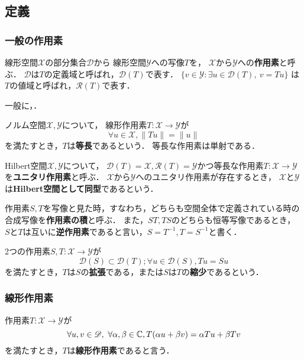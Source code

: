 \documentclass[a4j]{jarticle}
\newcommand{\dom}{\mathscr{D}}
\newcommand{\range}{\mathscr{R}}
\newcommand{\spX}{\mathscr{X}}
\newcommand{\spY}{\mathscr{Y}}
\begin{document}
    \subsection{定義}
    \subsubsection{一般の作用素}
    \begin{Def}
        線形空間$\spX$の部分集合$\dom$から
        線形空間$\spY$への写像$T$を，
        $\spX$から$\spY$への\textbf{作用素}と呼ぶ．
        $\dom$は$T$の定義域と呼ばれ，$\dom(T)$で表す．
        $\{v \in \spY : \exists u \in \dom(T),~ v=Tu\}$
        は$T$の値域と呼ばれ，$\range(T)$で表す．
    \end{Def}
    一般に，．

    \begin{Def}
        ノルム空間$\spX, \spY$について，
        線形作用素$T:\spX \to \spY$が
        \[ \forall u \in \spX, \| Tu \|=\|u\| \]
        を満たすとき，$T$は\textbf{等長}であるという．
        等長な作用素は単射である．
    \end{Def}

    \begin{Def}
        Hilbert空間$\spX, \spY$について，
        $\dom(T)=\spX, \range(T)=\spY$かつ等長な作用素$T:\spX \to \spY$を\textbf{ユニタリ作用素}と呼ぶ．
        $\spX$から$\spY$へのユニタリ作用素が存在するとき，
        $\spX$と$\spY$は\textbf{Hilbert空間として同型}であるという．
    \end{Def}

    \begin{Def}
        作用素$S,T$を写像と見た時，すなわち，どちらも空間全体で定義されている時の合成写像を\textbf{作用素の積}と呼ぶ．
        また，$ST, TS$のどちらも恒等写像であるとき，
        $S$と$T$は互いに\textbf{逆作用素}であると言い，$S=T^{-1}, T=S^{-1}$と書く．
    \end{Def}

    \begin{Def}
        2つの作用素$S,T:\spX \to \spY$が
        \[ \dom(S) \subset \dom(T); \forall u \in \dom(S), Tu=Su \]
        を満たすとき，$T$は$S$の\textbf{拡張}である，または$S$は$T$の\textbf{縮少}であるという．
    \end{Def}

    \subsubsection{線形作用素}
    \begin{Def}
        作用素$T:\spX \to \spY$が
        \[ \forall u,v \in \dom,~ \forall \alpha, \beta \in \C, T(\alpha u+\beta v)=\alpha Tu+\beta Tv \]
        を満たすとき，$T$は\textbf{線形作用素}であると言う．
    \end{Def}
\end{document}
